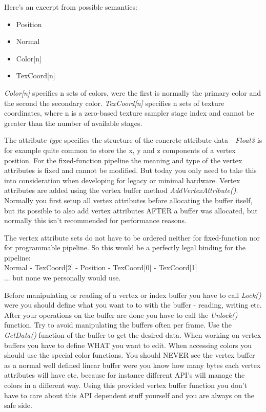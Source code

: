 Here's an excerpt from possible semantics:
\begin{itemize}
\item{Position}
\item{Normal}
\item{Color[n]}
\item{TexCoord[n]}
\end{itemize}

\emph{Color[n]} specifies n sets of colors, were the first is normally the primary color and the second the secondary color. \emph{TexCoord[n]} specifies n sets of texture coordinates, where n is a zero-based texture sampler stage index and cannot be greater than the number of available stages.

The attribute \emph{type} specifies the structure of the concrete attribute data - \emph{Float3} is for example quite common to store the x, y and z components of a vertex position. For the fixed-function pipeline the meaning and type of the vertex attributes is fixed and cannot be modified. But today you only need to take this into consideration when developing for legacy or minimal hardware. Vertex attributes are added using the vertex buffer method \emph{AddVertexAttribute()}. Normally you first setup all vertex attributes before allocating the buffer itself, but its possible to also add vertex attributes AFTER a buffer was allocated, but normally this isn't recommended for performance reasons.

The vertex attribute sets do not have to be ordered neither for fixed-function nor for programmable pipeline. So this would be a perfectly legal binding for the pipeline:\\
Normal - TexCoord[2] - Position - TexCoord[0] - TexCoord[1]\\
... but none we personally would use.

Before manipulating or reading of a vertex or index buffer you have to call \emph{Lock()} were you should define what you want to to with the buffer - reading, writing etc. After your operations on the buffer are done you have to call the \emph{Unlock()} function. Try to avoid manipulating the buffers often per frame. Use the \emph{GetData()} function of the buffer to get the desired data. When working on vertex buffers you have to define WHAT you want to edit. When accessing colors you should use the special color functions. You should NEVER see the vertex buffer as a normal well defined linear buffer were you know how many bytes each vertex attributes will have etc. because for instance different API's will manage the colors in a different way. Using this provided vertex buffer function you don't have to care about this API dependent stuff yourself and you are always on the safe side.


